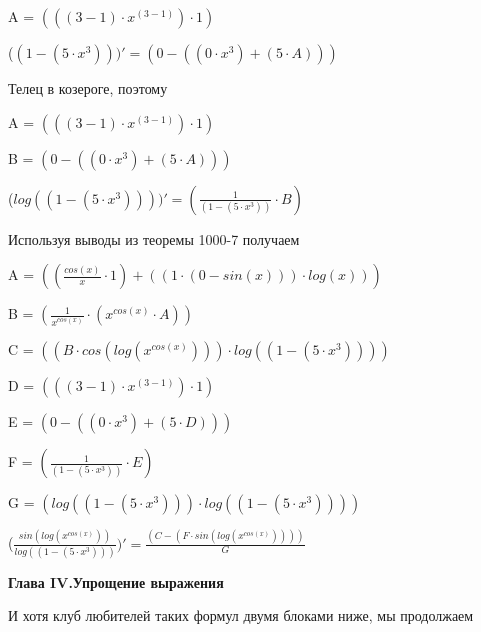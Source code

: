\documentclass[12pt,a4paper,fleqn]{article}
\begin{document}
\begin{center}
A = $(((3-1) \cdot x^{(3-1)}) \cdot 1)$\end{center}
\begin{center}
 ($(1-(5 \cdot x^{3})))'
  = (0-((0 \cdot x^{3})+(5 \cdot A)))$\end{center}
Телец в козероге, поэтому

\begin{center}
A = $(((3-1) \cdot x^{(3-1)}) \cdot 1)$\end{center}
\begin{center}
B = $(0-((0 \cdot x^{3})+(5 \cdot A)))$\end{center}
\begin{center}
 ($log((1-(5 \cdot x^{3}))))'
  = (\frac{1}{(1-(5 \cdot x^{3}))} \cdot B)$\end{center}
Используя выводы из теоремы 1000-7 получаем

\begin{center}
A = $((\frac{cos(x)}{x} \cdot 1)+((1 \cdot (0-sin(x))) \cdot log(x)))$\end{center}
\begin{center}
B = $(\frac{1}{x^{cos(x)}} \cdot (x^{cos(x)} \cdot A))$\end{center}
\begin{center}
C = $((B \cdot cos(log(x^{cos(x)}))) \cdot log((1-(5 \cdot x^{3}))))$\end{center}
\begin{center}
D = $(((3-1) \cdot x^{(3-1)}) \cdot 1)$\end{center}
\begin{center}
E = $(0-((0 \cdot x^{3})+(5 \cdot D)))$\end{center}
\begin{center}
F = $(\frac{1}{(1-(5 \cdot x^{3}))} \cdot E)$\end{center}
\begin{center}
G = $(log((1-(5 \cdot x^{3}))) \cdot log((1-(5 \cdot x^{3}))))$\end{center}
\begin{center}
 ($\frac{sin(log(x^{cos(x)}))}{log((1-(5 \cdot x^{3})))})'
  = \frac{(C-(F \cdot sin(log(x^{cos(x)}))))}{G}$\end{center}
\newpage \textbf{\LARGE{Глава IV.Упрощение выражения}}

И хотя клуб любителей таких формул двумя блоками ниже, мы продолжаем
\end{document}
